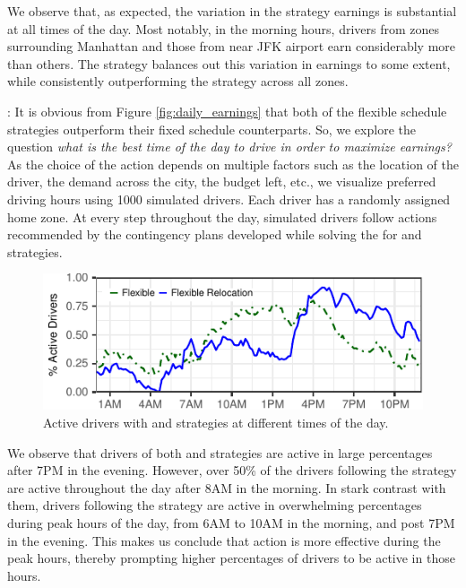 We observe that, as expected, the variation in the {\naive} strategy earnings is substantial at all times of the day. Most notably, in the morning hours, drivers from zones surrounding Manhattan and those from near JFK airport earn considerably more than others. The {\relocation} strategy balances out this variation in earnings to some extent, while consistently outperforming the {\naive} strategy across all zones.

: It is obvious from Figure \ref{fig:daily_earnings} that both of the flexible schedule strategies outperform their fixed schedule counterparts. So, we explore the question \textit{what is the best time of the day to drive in order to maximize earnings?} As the choice of the {\gohome} action depends on multiple factors such as the location of the driver, the demand across the city, the budget left, etc., we visualize preferred driving hours using 1000 simulated drivers. Each driver has a randomly assigned home zone. At every step throughout the day, simulated drivers follow actions recommended by the contingency plans developed while solving the {\originalproblem} for {\flexible} and {\relocationflexible} strategies.

\begin{figure}[H]
	\centering
	\includegraphics{figures/simulated_schedules.pdf}
	\caption{Active drivers with {\flexible} and {\relocationflexible}
	strategies at different times of the day.}
	\label{fig:simulated_schedules}
\end{figure}

We observe that drivers of both {\flexible} and {\relocationflexible} strategies are active in large percentages after 7PM in the evening. However, over 50\% of the drivers following the {\flexible} strategy are active throughout the day after 8AM in the morning. In stark contrast with them, drivers following the {\relocationflexible} strategy are active in overwhelming percentages during peak hours of the day, from 6AM to 10AM in the morning, and post 7PM in the evening. This makes us conclude that {\relocate} action is more effective during the peak hours, thereby prompting higher percentages of {\relocationflexible} drivers to be active in those hours.

